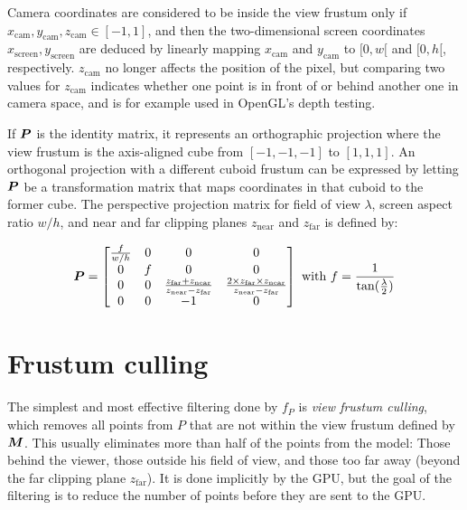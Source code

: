 \documentclass[a4paper,11pt,abstracton,notitlepage]{scrreprt}
\begin{document}
Camera coordinates are considered to be inside the view frustum only if $x_{\mathrm{cam}}, y_{\mathrm{cam}}, z_{\mathrm{cam}} \in [-1, 1]$, and then the two-dimensional screen coordinates $x_{\mathrm{screen}}, y_{\mathrm{screen}}$ are deduced by linearly mapping $x_{\mathrm{cam}}$ and $y_{\mathrm{cam}}$ to $[0, w[$ and $[0, h[$, respectively. $z_{\mathrm{cam}}$ no longer affects the position of the pixel, but comparing two values for $z_{\mathrm{cam}}$ indicates whether one point is in front of or behind another one in camera space, and is for example used in OpenGL's depth testing.

If $\matrixsym{P}$ is the identity matrix, it represents an orthographic projection where the view frustum is the axis-aligned cube from $[-1, -1, -1]$ to $[1, 1, 1]$. An orthogonal projection with a different cuboid frustum can be expressed by letting $\matrixsym{P}$ be a transformation matrix that maps coordinates in that cuboid to the former cube. The perspective projection matrix for field of view $\lambda$, screen aspect ratio $w/h$, and near and far clipping planes $z_{\mathrm{near}}$ and $z_{\mathrm{far}}$ is defined by:

\begin{displaymath}
\matrixsym{P} = \begin{bmatrix}
\frac{f}{w/h} & 0 & 0 & 0 \\
0 & f & 0 & 0 \\
0 & 0 & \frac{z_{\mathrm{far}} + z_{\mathrm{near}}}{z_{\mathrm{near}} - z_{\mathrm{far}}} & \frac{2 \times z_{\mathrm{far}} \times z_{\mathrm{near}}}{z_{\mathrm{near}} - z_{\mathrm{far}}} \\
0 & 0 & -1 & 0
\end{bmatrix}
\text{ with }
f = \frac{1}{\tan(\frac{\lambda}{2})}
\end{displaymath}



\section{Frustum culling}
The simplest and most effective filtering done by $f_{P}$ is \emph{view frustum culling}, which removes all points from $P$ that are not within the view frustum defined by $\matrixsym{M}$. This usually eliminates more than half of the points from the model: Those behind the viewer, those outside his field of view, and those too far away (beyond the far clipping plane $z_{\mathrm{far}}$). It is done implicitly by the GPU, but the goal of the filtering is to reduce the number of points before they are sent to the GPU.
\end{document}

